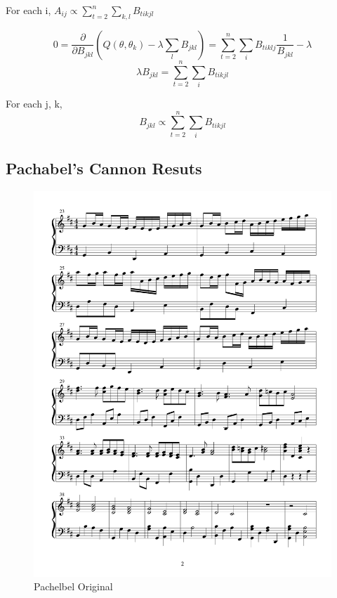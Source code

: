 \documentclass{article} %
\begin{document}
For each i, $A_{ij} \propto \sum_{t=2}^n \sum_{k,l} B_{tikjl}$ \newline

$$ 0 = \frac{\partial}{\partial B_{jkl}} (Q(\theta, \theta_k) - \lambda \sum_l B_{jkl}) = \sum_{t=2}^n \sum_i B_{tiklj} \frac{1}{B_{jkl}} - \lambda$$
$$ \lambda B_{jkl} = \sum_{t=2}^n \sum_i B_{tikjl}$$

For each j, k, \newline
$$B_{jkl} \propto \sum_{t=2}^n \sum_i B_{tikjl}$$

\subsection{Pachabel's Cannon Resuts}

\begin{figure}[H]
\centering
\caption{Pachelbel Original}
\includegraphics [scale = 0.6] {PachelbelOriginal-cropped.pdf}
\end{figure}
\end{document}
